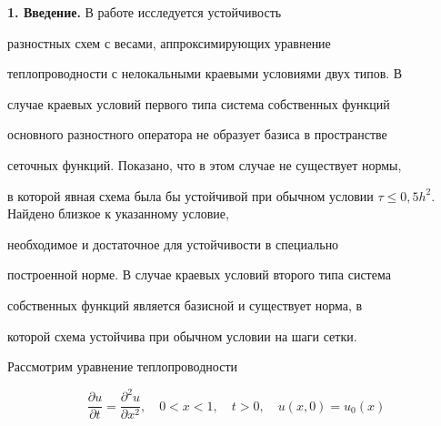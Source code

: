 \date{}




\pagestyle{plain} %







\maketitle


\label{begin}








{\bf 1. Введение.} В работе исследуется устойчивость


разностных схем с весами, аппроксимирующих уравнение


теплопроводности с нелокальными краевыми условиями двух типов. В


случае краевых условий первого типа система собственных функций


основного разностного оператора не образует базиса в пространстве


сеточных функций. Показано, что в этом случае не существует нормы,


в которой явная схема была бы устойчивой при обычном условии $\tau


\leqslant 0{,}5 h^{2}$. Найдено близкое к указанному условие,


необходимое и достаточное для устойчивости в специально


построенной норме. В случае краевых условий второго типа система


собственных функций является базисной и существует норма, в


которой схема устойчива при обычном условии на шаги сетки.








Рассмотрим уравнение теплопроводности


\begin{equation}\label{1}


\frac{{\partial u}} {{\partial t}}=\frac{{\partial ^2 u}}


{{\partial x^2}},\quad 0 < x < 1,\quad t > 0, \quad


u(x,0)=u_{0}(x)


\end{equation}


